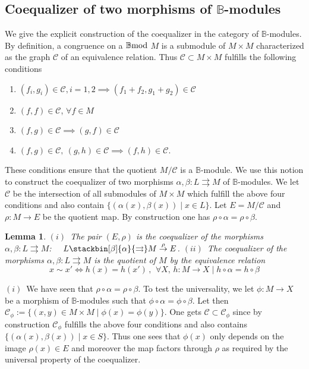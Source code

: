 \documentclass[12pt]{article}
\newtheorem{lem}[thm]{Lemma}
\def\B{{\mathbb B}}
\def\cC{{\mathcal C}}
\def\qqq{\,,\,~\forall}
\def\bmod{{\rm \B mod}}
\begin{document}
 \subsection{Coequalizer of two morphisms of $\B$-modules}
We give the explicit construction of the coequalizer in the category of $\B$-modules.  
 By definition, a congruence on a $\bmod$ $M$ is a submodule of $M\times M$ characterized as the graph $\cC$ of an equivalence relation. Thus $\cC\subset M \times M$ fulfills the following conditions
\begin{enumerate}
\item $(f_i,g_i)\in \cC, i=1,2\implies (f_1+f_2,g_1+g_2)\in \cC$
\item $(f,f)\in \cC$, $\forall f\in M$
\item $(f,g)\in \cC\implies (g,f)\in\cC$
\item $(f,g)\in \cC, \ (g,h)\in \cC\implies (f,h)\in\cC$.
\end{enumerate}
These conditions ensure that  the quotient $M/\cC$ is a $\B$-module. 
We  use this notion to construct the coequalizer of two morphisms $\alpha,\beta:L\rightrightarrows M$ of $\B$-modules. We let $\cC$ be the intersection of all submodules of $M\times M$ which fulfill the above four conditions and also contain $\{(\alpha(x),\beta(x))\mid x\in L\}$. Let $E=M/\cC$  and $\rho:M\to E$ be the quotient map. By construction one has $\rho\circ \alpha=\rho\circ \beta$. 
\begin{lem} \label{doublelem0} 
$(i)$~The pair $(E,\rho)$ is the coequalizer of the morphisms $\alpha,\beta:L\rightrightarrows M$:~~
$
L \stackbin[\beta]{\alpha}{\rightrightarrows} M \stackrel{\rho}{\to} E
$.\newline
$(ii)$~The coequalizer of the morphisms $\alpha,\beta:L\rightrightarrows M$ is the quotient of $M$ by the equivalence relation
\begin{equation}\label{coequequiv}
	x\sim x'\iff h(x)=h(x') \qqq X,\, h:M\to X\mid h\circ \alpha=h\circ \beta
\end{equation}

\end{lem}
\proof $(i)$~We have seen that  $\rho\circ \alpha=\rho\circ \beta$. To test the universality, we let $\phi:M\to X$ be a morphism of $\B$-modules such that $\phi\circ \alpha=\phi\circ \beta$. Let then
$
\cC_\phi:=\{(x,y)\in M\times M\mid \phi(x)=\phi(y)\}
$. 
One gets $\cC\subset \cC_\phi$ since by construction $\cC_\phi$ fulfills the above four conditions and also contains $\{(\alpha(x),\beta(x))\mid x\in S\}$. Thus one sees that $\phi(x)$ only depends on the image $\rho(x)\in E$ and moreover the map factors through $\rho$ as required by the universal property of the coequalizer. \newline
\end{document}
